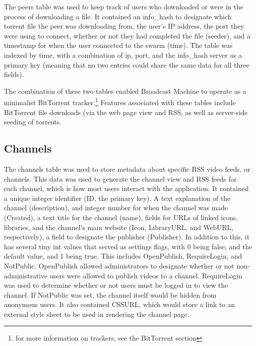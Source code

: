 \documentclass[a4paper,12pt]{report}
\begin{document}
The peers table was used to keep track of users who downloaded or were in the process of downloading a file. It contained an info\_hash to designate which torrent file the peer was downloading from, the user's IP address, the port they were using to connect, whether or not they had completed the file (seeder), and a timestamp for when the user connected to the swarm (time). The table was indexed by time, with a combination of ip, port, and the info\_hash server as a primary key (meaning that no two entries could share the same data for all three fields). 


The combination of these two tables enabled Broadcast Machine to operate as a minimalist BitTorrent tracker.\footnote{for more information on trackers, see the BitTorrent section} Features associated with these tables include BitTorrent file downloads (via the web page view and RSS, as well as server-side seeding of torrents.


\subsection{Channels}
The channels table was used to store metadata about specific RSS video feeds, or channels. This data was used to generate the channel view and RSS feeds for each channel, which is how most users interact with the application. 
It contained a unique integer identifier (ID, the primary key), A text explanation of the channel (description), and integer number for when the channel was made (Created), a text title for the channel (name), fields for URLs of linked icons, libraries, and the channel's main website (Icon, LibraryURL, and WebURL, respectively), a field to designate the publisher (Publisher). In addition to this, it has several tiny int values that served as settings flags, with 0 being false, and the default value, and 1 being true. This includes OpenPublish, RequireLogin, and NotPublic. OpenPublish allowed administrators to designate whether or not non-administrative users were allowed to publish videos to a channel. RequireLogin was used to determine whether or not users must be logged in to view the channel. If NotPublic was set, the channel itself would be hidden from anonymous users.
It also contained CSSURL, which would store a link to an external style sheet to be used in rendering the channel page.
\end{document}
